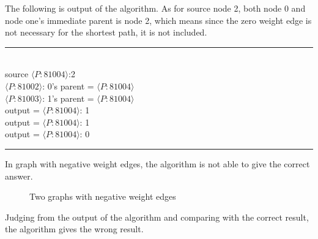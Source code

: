 \documentclass[11pt]{article}  %
\begin{document}
The following is output of the algorithm. As for source node 2, both node 0 and node one's immediate parent is node 2, which means since the zero weight edge is not necessary for the shortest path, it is not included.\par
\noindent
\rule{3in}{.1pt}
\noindent \\
source $\langle P:81004\rangle$:2\\
$\langle P:81002\rangle$: 0's parent =  $\langle P:81004\rangle$\\
$\langle P:81003\rangle$: 1's parent =  $\langle P:81004\rangle$\\
output = {$\langle P:81004\rangle$: 1}\\
output = {$\langle P:81004\rangle$: 1}\\
output = {$\langle P:81004\rangle$: 0}\\
\rule{3in}{.1pt}\par

In graph with negative weight edges, the algorithm is not able to give the correct answer. \par

\begin{figure}[htbp]
\centering
{}
\quad
{}
\caption{ Two graphs with negative weight edges}
\end{figure}\par

Judging from the output of the algorithm and comparing with the correct result, the algorithm gives the wrong result.\par
\end{document}
